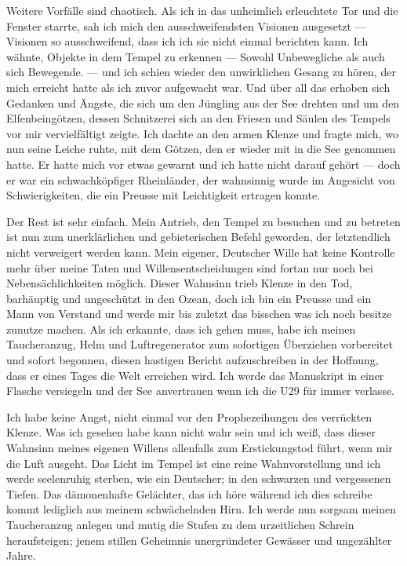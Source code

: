 \documentclass[a4paper]{memoir}
\begin{document}
Weitere Vorfälle sind chaotisch. Als ich in das unheimlich erleuchtete Tor und die Fenster starrte, sah ich mich den ausschweifendsten Visionen ausgesetzt --- Visionen so ausschweifend, dass ich ich sie nicht einmal berichten kann. Ich wähnte, Objekte in dem Tempel zu erkennen --- Sowohl Unbewegliche als auch sich Bewegende. --- und ich schien wieder den unwirklichen Gesang zu hören, der mich erreicht hatte als ich zuvor aufgewacht war. Und über all das erhoben sich Gedanken und Ängste, die sich um den Jüngling aus der See drehten und um den Elfenbeingötzen, dessen Schnitzerei sich an den Friesen und Säulen des Tempels vor mir vervielfältigt zeigte. Ich dachte an den armen Klenze und fragte mich, wo nun seine Leiche ruhte, mit dem Götzen, den er wieder mit in die See genommen hatte. Er hatte mich vor etwas gewarnt und ich hatte nicht darauf gehört --- doch er war ein schwachköpfiger Rheinländer, der wahnsinnig wurde im Angesicht von Schwierigkeiten, die ein Preusse mit Leichtigkeit ertragen konnte.

Der Rest ist sehr einfach. Mein Antrieb, den Tempel zu besuchen und zu betreten ist nun zum unerklärlichen und gebieterischen Befehl geworden, der letztendlich nicht verweigert werden kann. Mein eigener, Deutscher Wille hat keine Kontrolle mehr über meine Taten und Willensentscheidungen sind fortan nur noch bei Nebensächlichkeiten möglich. Dieser Wahnsinn trieb Klenze in den Tod, barhäuptig und ungeschützt in den Ozean, doch ich bin ein Preusse und ein Mann von Verstand und werde mir bis zuletzt das bisschen was ich noch besitze zunutze machen. Als ich erkannte, dass ich gehen muss, habe ich meinen Taucheranzug, Helm und Luftregenerator zum sofortigen Überziehen vorbereitet und sofort begonnen, diesen hastigen Bericht aufzuschreiben in der Hoffnung, dass er eines Tages die Welt erreichen wird. Ich werde das Manuskript in einer Flasche versiegeln und der See anvertrauen wenn ich die U29 für immer verlasse.

Ich habe keine Angst, nicht einmal vor den Prophezeihungen des verrückten Klenze. Was ich gesehen habe kann nicht wahr sein und ich weiß, dass dieser Wahnsinn meines eigenen Willens allenfalls zum Erstickungstod führt, wenn mir die Luft ausgeht. Das Licht im Tempel ist eine reine Wahnvorstellung und ich werde seelenruhig sterben, wie ein Deutscher; in den schwarzen und vergessenen Tiefen. Das dämonenhafte Gelächter, das ich höre während ich dies schreibe kommt lediglich aus meinem schwächelnden Hirn. Ich werde nun sorgsam meinen Taucheranzug anlegen und mutig die Stufen zu dem urzeitlichen Schrein heraufsteigen; jenem stillen Geheimnis unergründeter Gewässer und ungezählter Jahre.
\end{document}
